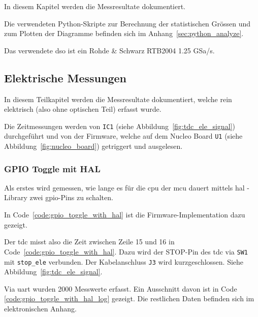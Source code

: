 In diesem Kapitel werden die Messresultate dokumentiert.

Die verwendeten Python-Skripte zur Berechnung der statistischen Grössen und zum Plotten der Diagramme befinden sich im
Anhang~\ref{sec:python_analyze}.

Das verwendete \acrfull{dso} ist ein Rohde \& Schwarz RTB2004 1.25 GSa/s.

\subsection{Elektrische Messungen}

In diesem Teilkapitel werden die Messresultate dokumentiert, welche rein elektrisch (also ohne optischen Teil) erfasst
wurde.

Die Zeitmessungen werden von \lstinline|IC1| (siehe Abbildung~\ref{fig:tdc_ele_signal}) durchgeführt und von der
Firmware, welche auf dem Nucleo Board \lstinline|U1| (siehe Abbildung~\ref{fig:nucleo_board}) getriggert und ausgelesen.

\subsubsection{GPIO Toggle mit HAL}\label{sec:gpio_toggle_with_hal}

Als erstes wird gemessen, wie lange es für die \acrshort{cpu} der \acrshort{mcu} dauert mittels \acrfull{hal} - Library
\cite{st2020stm32f0_hal} zwei \acrshort{gpio}-Pins zu schalten.

In Code~\ref{code:gpio_toggle_with_hal} ist die Firmware-Implementation dazu gezeigt.



Der \acrshort{tdc} misst also die Zeit zwischen Zeile 15 und 16 in Code~\ref{code:gpio_toggle_with_hal}. Dazu wird der
STOP-Pin des \acrshort{tdc} via \lstinline|SW1| mit \lstinline|stop_ele| verbunden. Der Kabelanschluss \lstinline|J3|
wird kurzgeschlossen. Siehe Abbildung~\ref{fig:tdc_ele_signal}.

Via \acrshort{uart} wurden 2000 Messwerte erfasst. Ein Ausschnitt davon ist in Code \ref{code:gpio_toggle_with_hal_log}
gezeigt. Die restlichen Daten befinden sich im elektronischen Anhang.



